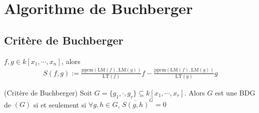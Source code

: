     \section{Algorithme de Buchberger}
        \subsection{Critère de Buchberger}
            \begin{defi}
                $f,g \in k[x_1, \cdots, x_n]$, alors
                \begin{align*}
                    S(f,g) := \frac{\mathrm{ppcm} (\mathrm{LM}(f), \mathrm{LM}(g))}{\mathrm{LT}(f)}f - \frac{\mathrm{ppcm} (\mathrm{LM}(f), \mathrm{LM}(g))}{\mathrm{LT}(g)}g
                \end{align*}
            \end{defi}
            \begin{theo} (Critère de Buchberger)
                Soit $G = \{g_1, \cdot, g_r\} \subseteq k[x_1, \cdots, x_r]$. Alors $G$ est une BDG de $(G)$ si et seulement si $\forall g,h \in G$, $\overline{S(g,h)}^G = 0$
            \end{theo}

